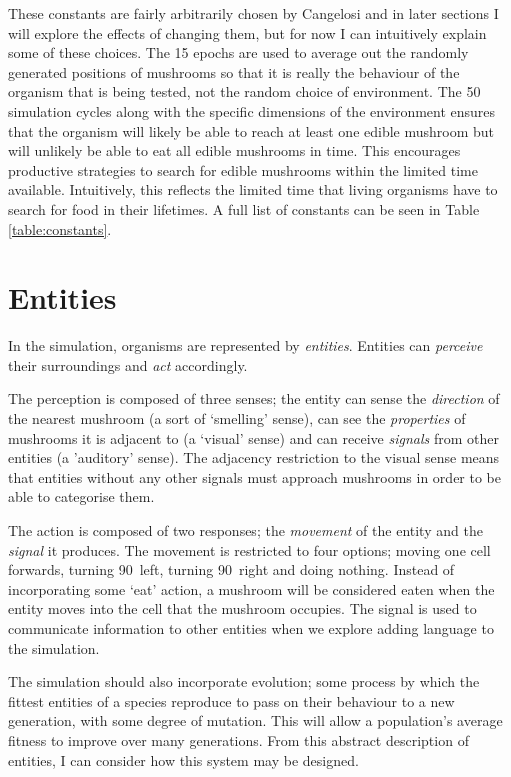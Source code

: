 \documentclass[12pt,a4paper,twoside,openright]{report}
\begin{document}
These constants are fairly arbitrarily chosen by Cangelosi and in later sections I will explore the effects of changing them, but for now I can intuitively explain some of these choices. The 15 epochs are used to average out the randomly generated positions of mushrooms so that it is really the behaviour of the organism that is being tested, not the random choice of environment. The 50 simulation cycles along with the specific dimensions of the environment ensures that the organism will likely be able to reach at least one edible mushroom but will unlikely be able to eat all edible mushrooms in time. This encourages productive strategies to search for edible mushrooms within the limited time available. Intuitively, this reflects the limited time that living organisms have to search for food in their lifetimes. A full list of constants can be seen in Table \ref{table:constants}.

\section{Entities}\label{section:entities}

In the simulation, organisms are represented by \emph{entities}. Entities can \emph{perceive} their surroundings and \emph{act} accordingly.

The perception is composed of three senses; the entity can sense the \emph{direction} of the nearest mushroom (a sort of `smelling' sense), can see the \emph{properties} of mushrooms it is adjacent to (a `visual' sense) and can receive \emph{signals} from other entities (a 'auditory' sense). The adjacency restriction to the visual sense means that entities without any other signals must approach mushrooms in order to be able to categorise them.

The action is composed of two responses; the \emph{movement} of the entity and the \emph{signal} it produces. The movement is restricted to four options; moving one cell forwards, turning 90\textdegree~left, turning 90\textdegree~right and doing nothing. Instead of incorporating some `eat' action, a mushroom will be considered eaten when the entity moves into the cell that the mushroom occupies. The signal is used to communicate information to other entities when we explore adding language to the simulation.

The simulation should also incorporate evolution; some process by which the fittest entities of a species reproduce to pass on their behaviour to a new generation, with some degree of mutation. This will allow a population's average fitness to improve over many generations. From this abstract description of entities, I can consider how this system may be designed.
\end{document}
